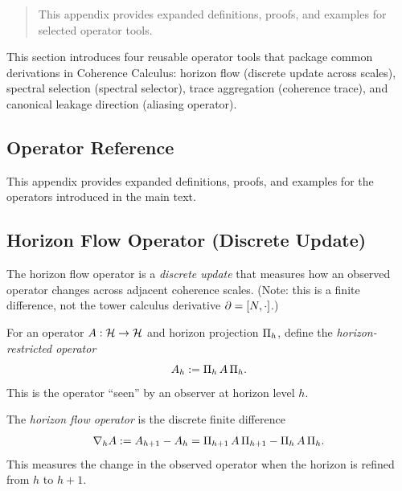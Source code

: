 \label{sec:advanced-operators}

\begin{quote}\small
This appendix provides expanded definitions, proofs, and examples for selected operator tools.
\end{quote}

This section introduces four reusable operator tools that package common derivations in Coherence Calculus:
horizon flow (discrete update across scales), spectral selection (spectral selector), trace aggregation (coherence trace), and canonical leakage direction (aliasing operator).

\subsection{Operator Reference}
\label{subsec:operator-atlas}

This appendix provides expanded definitions, proofs, and examples for the operators introduced in the main text.

\subsection{Horizon Flow Operator (Discrete Update)}
\label{subsec:horizon-flow}

The horizon flow operator is a \emph{discrete update} that measures how an observed operator changes across adjacent coherence scales.
(Note: this is a finite difference, not the tower calculus derivative $\partial = [\CCIndexOp, \cdot]$.)

\begin{definition}
\label{def:horizon-restricted}
For an operator $A:\cH \to \cH$ and horizon projection $\CCPi{h}$, define the \emph{horizon-restricted operator}
\[
\CCObs{A}{h} := \CCRestr{A}{h}.
\]
This is the operator ``seen'' by an observer at horizon level $h$.
\end{definition}

\begin{definition}
\label{def:horizon-flow}
The \emph{horizon flow operator} is the discrete finite difference
\[
\CCFlow{A}{h} := \CCObs{A}{h+1} - \CCObs{A}{h} = \CCRestr{A}{h+1} - \CCRestr{A}{h}.
\]
This measures the change in the observed operator when the horizon is refined from $h$ to $h+1$.
\end{definition}

